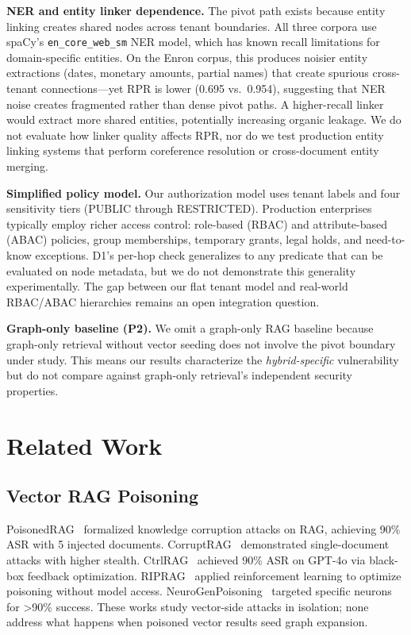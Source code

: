 \documentclass[letterpaper,twocolumn,10pt]{article}
\begin{document}
\textbf{NER and entity linker dependence.} The pivot path exists
because entity linking creates shared nodes across tenant boundaries.
All three corpora use spaCy's \texttt{en\_core\_web\_sm} NER model,
which has known recall limitations for domain-specific entities. On
the Enron corpus, this produces noisier entity extractions (dates,
monetary amounts, partial names) that create spurious cross-tenant
connections---yet RPR is lower (0.695 vs.\ 0.954), suggesting that
NER noise creates fragmented rather than dense pivot paths.
A higher-recall linker would extract more shared entities, potentially
increasing organic leakage. We do not evaluate how linker quality
affects RPR, nor do we test production entity linking systems that
perform coreference resolution or cross-document entity merging.

\textbf{Simplified policy model.} Our authorization model uses
tenant labels and four sensitivity tiers (PUBLIC through RESTRICTED).
Production enterprises typically employ richer access control:
role-based (RBAC) and attribute-based (ABAC) policies, group
memberships, temporary grants, legal holds, and need-to-know
exceptions. D1's per-hop check generalizes to any predicate that can
be evaluated on node metadata, but we do not demonstrate this
generality experimentally. The gap between our flat tenant model and
real-world RBAC/ABAC hierarchies remains an open integration question.

\textbf{Graph-only baseline (P2).} We omit a graph-only RAG baseline
because graph-only retrieval without vector seeding does not involve
the pivot boundary under study. This means our results characterize
the \emph{hybrid-specific} vulnerability but do not compare against
graph-only retrieval's independent security properties.

\section{Related Work}
\label{sec:related_work}

\subsection{Vector RAG Poisoning}

PoisonedRAG~\cite{zou2025poisonedrag} formalized knowledge corruption
attacks on RAG, achieving 90\% ASR with 5 injected documents.
CorruptRAG~\cite{corruptrag2025} demonstrated single-document attacks
with higher stealth. CtrlRAG~\cite{ctrlrag2025} achieved 90\% ASR on
GPT-4o via black-box feedback optimization.
RIPRAG~\cite{riprag2025} applied reinforcement learning to optimize
poisoning without model access.
NeuroGenPoisoning~\cite{neurogenpoison2025} targeted specific neurons
for >90\% success. These works study vector-side attacks in isolation;
none address what happens when poisoned vector results seed graph
expansion.
\end{document}

